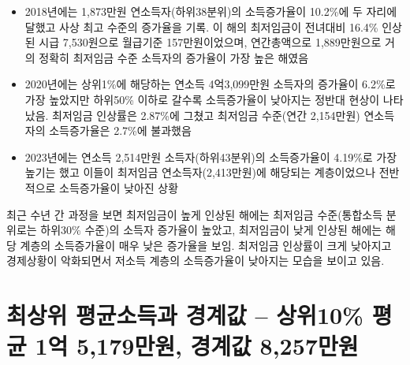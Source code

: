 \documentclass[
  a4paper,
  oneside,
  open=any]{scrbook}
\providecommand{\tightlist}{%
  \setlength{\itemsep}{0pt}\setlength{\parskip}{0pt}}\usepackage{longtable,booktabs,array}
\begin{document}
\begin{figure}
\begin{minipage}{\linewidth}


\end{minipage}%

\end{figure}%

\begin{itemize}
\tightlist
\item
  2018년에는 1,873만원 연소득자(하위38분위)의 소득증가율이 10.2\%에 두
  자리에 달했고 사상 최고 수준의 증가율을 기록. 이 해의 최저임금이
  전녀대비 16.4\% 인상된 시급 7,530원으로 월급기준 157만원이었으며,
  연간총액으로 1,889만원으로 거의 정확히 최저임금 수준 소득자의 증가율이
  가장 높은 해였음
\item
  2020년에는 상위1\%에 해당하는 연소득 4억3,099만원 소득자의 증가율이
  6.2\%로 가장 높았지만 하위50\% 이하로 갈수록 소득증가율이 낮아지는
  정반대 현상이 나타났음. 최저임금 인상률은 2.87\%에 그쳤고 최저임금
  수준(연간 2,154만원) 연소득자의 소득증가율은 2.7\%에 불과했음
\item
  2023년에는 연소득 2,514만원 소득자(하위43분위)의 소득증가율이 4.19\%로
  가장 높기는 했고 이들이 최저임금 연소득자(2,413만원)에 해당되는
  계층이었으나 전반적으로 소득증가율이 낮아진 상황
\end{itemize}

최근 수년 간 과정을 보면 최저임금이 높게 인상된 해에는 최저임금
수준(통합소득 분위로는 하위30\% 수준)의 소득자 증가율이 높았고,
최저임금이 낮게 인상된 해에는 해당 계층의 소득증가율이 매우 낮은
증가율을 보임. 최저임금 인상률이 크게 낮아지고 경제상황이 악화되면서
저소득 계층의 소득증가율이 낮아지는 모습을 보이고 있음.

\section{최상위 평균소득과 경계값 -- 상위10\% 평균 1억 5,179만원, 경계값
8,257만원}\label{uxcd5cuxc0c1uxc704-uxd3c9uxade0uxc18cuxb4dduxacfc-uxacbduxacc4uxac12-uxc0c1uxc70410-uxd3c9uxade0-1uxc5b5-5179uxb9ccuxc6d0-uxacbduxacc4uxac12-8257uxb9ccuxc6d0}
\end{document}
